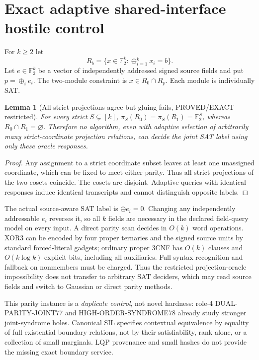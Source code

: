 \documentclass[11pt]{article}
\newtheorem{lemma}{Lemma}
\begin{document}
\section{Exact adaptive shared-interface hostile control}
For $k\ge2$ let
\[
R_b=\{x\in\mathbb F_2^k:\oplus_{i=1}^k x_i=b\}.
\]
Let $e\in\mathbb F_2^k$ be a vector of independently addressed signed source fields and put $p=\oplus_i e_i$. The two-module constraint is $x\in R_0\cap R_p$. Each module is individually SAT.

\begin{lemma}[All strict projections agree but gluing fails, PROVED/EXACT restricted]
For every strict $S\subsetneq[k]$, $\pi_S(R_0)=\pi_S(R_1)=\mathbb F_2^S$, whereas $R_0\cap R_1=\varnothing$. Therefore no algorithm, even with adaptive selection of arbitrarily many strict-coordinate projection relations, can decide the joint SAT label using only these oracle responses.
\end{lemma}
\begin{proof}
Any assignment to a strict coordinate subset leaves at least one unassigned coordinate, which can be fixed to meet either parity. Thus all strict projections of the two cosets coincide. The cosets are disjoint. Adaptive queries with identical responses induce identical transcripts and cannot distinguish opposite labels.
\end{proof}
The actual source-aware SAT label is $\oplus e_i=0$. Changing any independently addressable $e_i$ reverses it, so all $k$ fields are necessary in the declared field-query model on every input. A direct parity scan decides in $O(k)$ word operations. XOR3 can be encoded by four proper ternaries and the signed source units by standard forced-literal gadgets; ordinary proper 3CNF has $O(k)$ clauses and $O(k\log k)$ explicit bits, including all auxiliaries. Full syntax recognition and fallback on nonmembers must be charged. Thus the restricted projection-oracle impossibility does not transfer to arbitrary SAT deciders, which may read source fields and switch to Gaussian or direct parity methods.

This parity instance is a \emph{duplicate control}, not novel hardness: role-4 DUAL-PARITY-JOINT77 and HIGH-ORDER-SYNDROME78 already study stronger joint-syndrome holes. Canonical SIL specifies contextual equivalence by equality of full existential boundary relations, not by their satisfiability, rank alone, or a collection of small marginals. LQP provenance and small hashes do not provide the missing exact boundary service.
\end{document}
